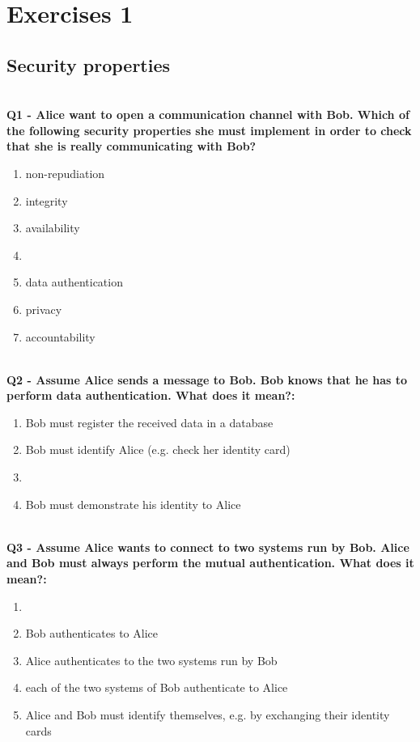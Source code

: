 \chapter{Exercises 1}

\section{Security properties}

\textbf{\\Q1 - Alice want to open a communication channel with Bob. Which of the following
	security properties she must implement in order to check that she is really communicating with Bob?}
\begin{enumerate}
	\item[A.] non-repudiation
	\item[B.] integrity
	\item[C.] availability
	\item[D.] 
	\item[E.] data authentication
	\item[F.] privacy
	\item[G.] accountability

\end{enumerate}


\textbf{\\Q2 - Assume Alice sends a message to Bob. Bob knows that he
	has to perform data authentication. What does it mean?:}
\begin{enumerate}
	\item[A.] Bob must register the received data in a database
	\item[B.] Bob must identify Alice (e.g. check her identity card)
	\item[C.] 
	\item[D.] Bob must demonstrate his identity to Alice
\end{enumerate}

\textbf{\\Q3 - Assume Alice wants to connect to two systems run by Bob. Alice and Bob must always perform the mutual authentication. What does it mean?:}
\begin{enumerate}
	\item[A.] 
	\item[B.] Bob authenticates to Alice
	\item[C.] Alice authenticates to the two systems run by Bob
	\item[D.] each of the two systems of Bob authenticate to Alice
	\item[E.] Alice and Bob must identify themselves, e.g. by exchanging their identity cards
\end{enumerate}

